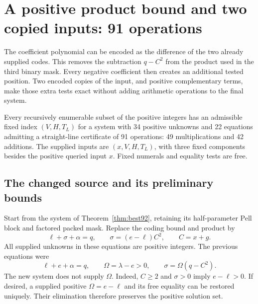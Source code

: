 \section{A positive product bound and two copied inputs: 91 operations}
\label{sec:product-bound}

The coefficient polynomial can be encoded as the difference of the two
already supplied codes. This removes the subtraction $q-C^2$ from the
product used in the third binary mask. Every negative coefficient then
creates an additional tested position. Two encoded copies of the input,
and positive complementary terms, make those extra tests exact without
adding arithmetic operations to the final system.

\begin{theorem}\label{thm:best91}
Every recursively enumerable subset of the positive integers has an
admissible fixed index $(V,H,T_L)$ for a system with 34 positive unknowns
and 22 equations admitting a straight-line certificate of 91 operations:
49 multiplications and 42 additions. The supplied inputs are
$(x,V,H,T_L)$, with three fixed components besides the positive queried
input $x$. Fixed numerals and equality tests are free.
\end{theorem}

\subsection{The changed source and its preliminary bounds}

Start from the system of Theorem~\ref{thm:best92}, retaining its
half-parameter Pell block and factored packed mask. Replace the coding
bound and product by
\begin{equation}\label{eq:product-bound-source}
 \ell+\sigma+\alpha=q,\qquad
 \sigma=(e-\ell)C^2,\qquad C=x+g.
\end{equation}
All supplied unknowns in these equations are positive integers. The
previous equations were
\[
 \ell+e+\alpha=q,\qquad
 \Omega=\lambda-e>0,\qquad
 \sigma=\Omega(q-C^2).
\]
The new system does not supply $\Omega$. Indeed, $C\ge2$ and
$\sigma>0$ imply $e-\ell>0$. If desired, a supplied positive
$\Omega=e-\ell$ and its free equality can be restored uniquely.
Their elimination therefore preserves the positive solution set.

